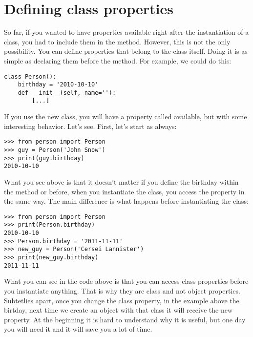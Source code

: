 
\section{Defining class properties}
So far, if you wanted to have properties available right after the instantiation of a class, you had to include them in the  method. However, this is not the only possibility. You can define properties that belong to the class itself. Doing it is as simple as declaring them before the  method. For example, we could do this:

\begin{verbatim}
class Person():
    birthday = '2010-10-10'
    def __init__(self, name=''):
        [...]
\end{verbatim}

If you use the new  class, you will have a property called  available, but with some interesting behavior. Let's see. First, let's start as always:

\begin{verbatim}
>>> from person import Person
>>> guy = Person('John Snow')
>>> print(guy.birthday)
2010-10-10
\end{verbatim}

What you see above is that it doesn't matter if you define the birthday within the  method or before, when you instantiate the class, you access the property in the same way. The main difference is what happens before instantiating the class:

\begin{verbatim}
>>> from person import Person
>>> print(Person.birthday)
2010-10-10
>>> Person.birthday = '2011-11-11'
>>> new_guy = Person('Cersei Lannister')
>>> print(new_guy.birthday)
2011-11-11
\end{verbatim}

What you can see in the code above is that you can access class properties before you instantiate anything. That is why they are class and not object properties. Subtetlies apart, once you change the class property, in the example above the birtday, next time we create an object with that class it will receive the new property. At the beginning it is hard to understand why it is useful, but one day you will need it and it will save you a lot of time. 

